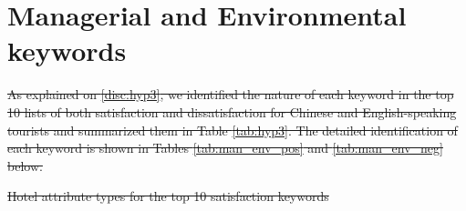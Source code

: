 \documentclass[smallextended,natbib]{svjour3}       %
\providecommand{\DIFdel}[1]{{\protect\color{red}\sout{#1}}}                      %
\providecommand{\DIFdelFL}[1]{\DIFdel{#1}} %
\begin{document}
\section{Managerial and Environmental keywords}%

\DIFdel{As explained on \ref{disc:hyp3}, we identified the nature of each keyword in the top 10 lists of both satisfaction and dissatisfaction for Chinese and English-speaking tourists and summarized them in Table \ref{tab:hyp3}. The detailed identification of each keyword is shown in Tables \ref{tab:man_env_pos} and \ref{tab:man_env_neg} below.
}%

{%
\DIFdelFL{Hotel attribute types for the top 10 satisfaction keywords}}
\end{document}

